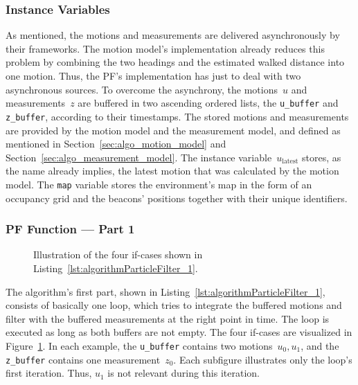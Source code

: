 \subsubsection*{Instance Variables}
As mentioned, the motions and measurements are delivered asynchronously by their frameworks. The motion model's implementation already reduces this problem by combining the two headings and the estimated walked distance into one motion. Thus, the \acs{PF}'s implementation has just to deal with two asynchronous sources. To overcome the asynchrony, the motions~$u$ and measurements~$z$ are buffered in two ascending ordered lists, the \texttt{u\_buffer} and \texttt{z\_buffer}, according to their timestamps. The stored motions and measurements are provided by the motion model and the measurement model, and defined as mentioned in Section~\ref{sec:algo_motion_model} and Section~\ref{sec:algo_measurement_model}. The instance variable~$u_\text{latest}$ stores, as the name already implies, the latest motion that was calculated by the motion model. The \texttt{map} variable stores the environment's map in the form of an occupancy grid and the beacons' positions together with their unique identifiers.


\subsubsection*{\acl{PF} Function --- Part 1}
\begin{figure}[height=0.3\textheight]
	
	\caption{Illustration of the four if-cases shown in Listing~\ref{lst:algorithmParticleFilter_1}.}
	\label{fig:algo_pf_1}
\end{figure}

The algorithm's first part, shown in Listing~\ref{lst:algorithmParticleFilter_1}, consists of basically one loop, which tries to integrate the buffered motions and filter with the buffered measurements at the right point in time. The loop is executed as long as both buffers are not empty. The four if-cases are visualized in Figure~\ref{fig:algo_pf_1}. In each example, the \texttt{u\_buffer} contains two motions~$u_0, u_1$, and the \texttt{z\_buffer} contains one measurement~$z_0$. Each subfigure illustrates only the loop's first iteration. Thus, $u_1$ is not relevant during this iteration.



